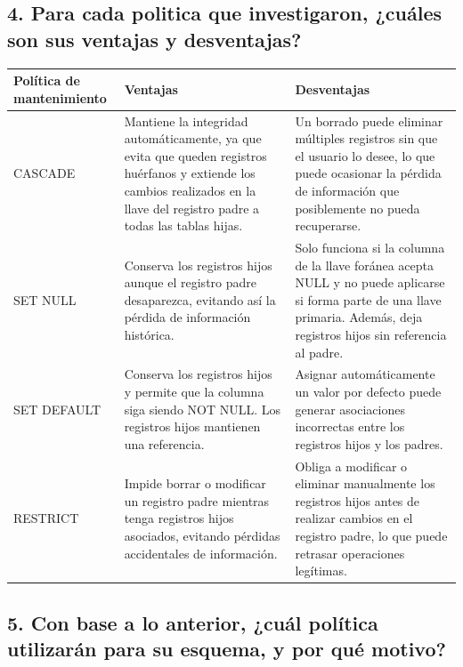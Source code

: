 \documentclass[12pt]{article}
\begin{document}
\subsection*{4. Para cada politica que investigaron, ¿cuáles son sus ventajas y desventajas?}

\begin{table}[H]
    \centering
    \begin{tabular}{lp{6cm}p{6cm}}
        \toprule
        \textbf{Política de mantenimiento} & \textbf{Ventajas} & \textbf{Desventajas} \\
        \midrule
        CASCADE 
        & Mantiene la integridad automáticamente, ya que evita que queden registros huérfanos y extiende los cambios realizados en la llave del registro padre a todas las tablas hijas.
        & Un borrado puede eliminar múltiples registros sin que el usuario lo desee, lo que puede ocasionar la pérdida de información que posiblemente no pueda recuperarse.\\
        \addlinespace
        SET NULL 
        & Conserva los registros hijos aunque el registro padre desaparezca, evitando así la pérdida de información histórica.
        & Solo funciona si la columna de la llave foránea acepta NULL y no puede aplicarse si forma parte de una llave primaria. Además, deja registros hijos sin referencia al padre.\\
        \addlinespace
         SET DEFAULT 
        & Conserva los registros hijos y permite que la columna siga siendo NOT NULL. Los registros hijos mantienen una referencia. 
        & Asignar automáticamente un valor por defecto puede generar asociaciones incorrectas entre los registros hijos y los padres. \\
        \addlinespace
        RESTRICT
        & Impide borrar o modificar un registro padre mientras tenga registros hijos asociados, evitando pérdidas accidentales de información.
        & Obliga a modificar o eliminar manualmente los registros hijos antes de realizar cambios en el registro padre, lo que puede retrasar operaciones legítimas.\\
        \bottomrule
    \end{tabular}
\end{table}

\subsection*{5. Con base a lo anterior, ¿cuál política utilizarán para su esquema, y por qué motivo?}
\end{document}
